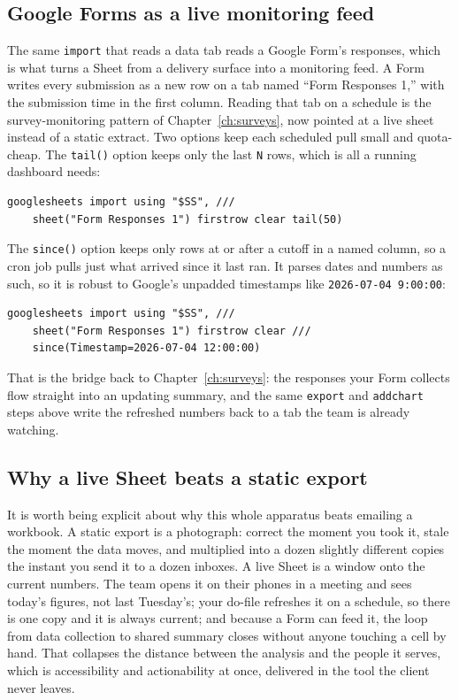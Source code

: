 \documentclass[
    a4paper,
    fontsize=10pt,
    twoside=true,
    numbers=noenddot,
]{kaobook}
\begin{document}
\subsection{Google Forms as a live monitoring feed}
The same \texttt{import} that reads a data tab reads a Google Form's responses, which is what turns a Sheet from a delivery surface into a monitoring feed. A Form writes every submission as a new row on a tab named \enquote{Form Responses 1,} with the submission time in the first column. Reading that tab on a schedule is the survey-monitoring pattern of Chapter~\ref{ch:surveys}, now pointed at a live sheet instead of a static extract. Two options keep each scheduled pull small and quota-cheap. The \texttt{tail()} option keeps only the last \texttt{N} rows, which is all a running dashboard needs:
{\footnotesize
\begin{verbatim}
googlesheets import using "$SS", ///
    sheet("Form Responses 1") firstrow clear tail(50)
\end{verbatim}
}
The \texttt{since()} option keeps only rows at or after a cutoff in a named column, so a cron job pulls just what arrived since it last ran. It parses dates and numbers as such, so it is robust to Google's unpadded timestamps like \texttt{2026-07-04 9:00:00}:
{\footnotesize
\begin{verbatim}
googlesheets import using "$SS", ///
    sheet("Form Responses 1") firstrow clear ///
    since(Timestamp=2026-07-04 12:00:00)
\end{verbatim}
}
That is the bridge back to Chapter~\ref{ch:surveys}: the responses your Form collects flow straight into an updating summary, and the same \texttt{export} and \texttt{addchart} steps above write the refreshed numbers back to a tab the team is already watching.

\subsection{Why a live Sheet beats a static export}
It is worth being explicit about why this whole apparatus beats emailing a workbook. A static export is a photograph: correct the moment you took it, stale the moment the data moves, and multiplied into a dozen slightly different copies the instant you send it to a dozen inboxes. A live Sheet is a window onto the current numbers. The team opens it on their phones in a meeting and sees today's figures, not last Tuesday's; your do-file refreshes it on a schedule, so there is one copy and it is always current; and because a Form can feed it, the loop from data collection to shared summary closes without anyone touching a cell by hand. That collapses the distance between the analysis and the people it serves, which is accessibility and actionability at once, delivered in the tool the client never leaves.
\end{document}
